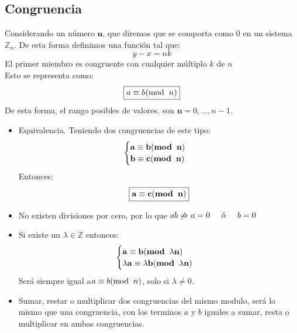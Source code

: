 \subsection{Congruencia}
 Considerando un número \(\mathbf{n}\), que diremos que se comporta como 0 en un sistema \(\mathbb{Z}_n\). De esta forma definimos una función tal que:
\[
        y - x = nk
\]
 El primer miembro es congruente con cualquier múltiplo \(k\) de \(n\)\\ Esto se representa como:
\[
        \boxed{a \equiv b(\textnormal{mod}\hspace{2mm}n)}
\]
 De esta forma, el rango posibles de valores, son \(\mathbf{n} = {0,...,n-1}\).\par
{} \par
\begin{itemize}
        \item Equivalencia. Teniendo dos congruencias de este tipo:\[\begin{cases}
                              \mathbf{a \equiv b(\textnormal{\textbf{mod}}\hspace{2mm}n)}\\ \mathbf{b \equiv c(\textnormal{\textbf{mod}}\hspace{2mm}n)}\end{cases}\] Entonces: \[\boxed{\mathbf{a \equiv c(\textnormal{\textbf{mod}}\hspace{2mm}n)}}\]
        \item No existen divisiones por cero, por lo que \(ab \not \Rightarrow a = 0 \textnormal{\hspace{5mm}ó\hspace{5mm}} b = 0\)
        \item Si existe un \(\lambda \in \mathbb{Z}\) entonces:\[\begin{cases}
                              \mathbf{a \equiv b(\textnormal{\textbf{mod}}\hspace{2mm}\lambda n)}\\ \mathbf{\lambda a \equiv \lambda b(\textnormal{\textbf{mod}}\hspace{2mm}\lambda n)}\end{cases}\]  Será siempre igual a\(a \equiv b(\textnormal{mod}\hspace{2mm}n)\), solo si \(\lambda \neq 0\).
        \item Sumar, restar o multiplicar dos congruencias del mismo modulo, será lo mismo que una congruencia, con los terminos \(a\) y \(b\) iguales a sumar, resta o multiplicar en ambas congruencias.
\end{itemize}
